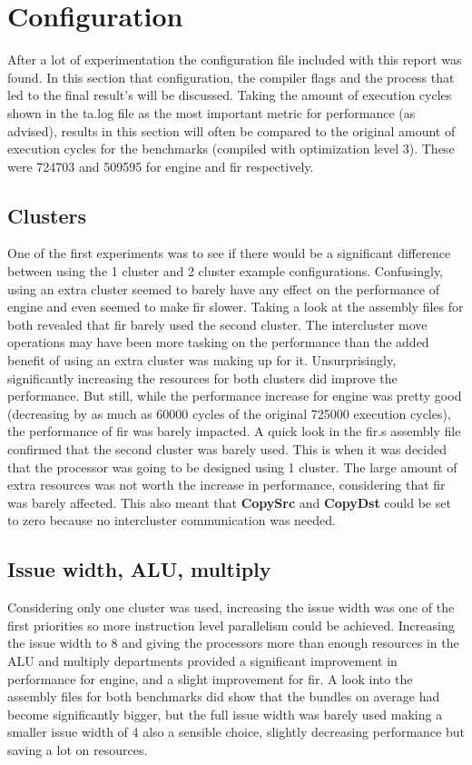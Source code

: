 \section{Configuration}
After a lot of experimentation the configuration file included with this report was found. In this section that configuration, the compiler flags and the process that led to the final result's will be discussed. Taking the amount of execution cycles shown in the ta.log file as the most important metric for performance (as advised), results in this section will often be compared to the original amount of execution cycles for the benchmarks (compiled with optimization level 3). These were 724703 and 509595 for engine and fir respectively.

\subsection{Clusters}
One of the first experiments was to see if there would be a significant difference between using the 1 cluster and 2 cluster example configurations. Confusingly, using an extra cluster seemed to barely have any effect on the performance of engine and even seemed to make fir slower. Taking a look at the assembly files for both revealed that fir barely used the second cluster. The intercluster move operations may have been more tasking on the performance than the added benefit of using an extra cluster was making up for it. Unsurprisingly, significantly increasing the resources for both clusters did improve the performance. But still, while the performance increase for engine was pretty good (decreasing by as much as 60000 cycles of the original 725000 execution cycles), the performance of fir was barely impacted. A quick look in the fir.s assembly file confirmed that the second cluster was barely used. This is when it was decided that the processor was going to be designed using 1 cluster. The large amount of extra resources was not worth the increase in performance, considering that fir was barely affected. This also meant that \textbf{CopySrc} and \textbf{CopyDst} could be set to zero because no intercluster communication was needed.

\subsection{Issue width, ALU, multiply}
Considering only one cluster was used, increasing the issue width was one of the first priorities so more instruction level parallelism could be achieved. Increasing the issue width to 8 and giving the processors more than enough resources in the ALU and multiply departments provided a significant improvement in performance for engine, and a slight improvement for fir. A look into the assembly files for both benchmarks did show that the bundles on average had become significantly bigger, but the full issue width was barely used making a smaller issue width of 4 also a sensible choice, slightly decreasing performance but saving a lot on resources.

